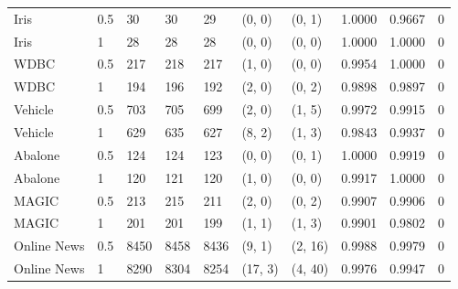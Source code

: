 \begin{tabular}{llllllllll}
Iris & 0.5 & 30 & 30 & 29 & (0, 0) & (0, 1) & 1.0000 & 0.9667 & 0 \\
Iris & 1 & 28 & 28 & 28 & (0, 0) & (0, 0) & 1.0000 & 1.0000 & 0 \\
WDBC & 0.5 & 217 & 218 & 217 & (1, 0) & (0, 0) & 0.9954 & 1.0000 & 0 \\
WDBC & 1 & 194 & 196 & 192 & (2, 0) & (0, 2) & 0.9898 & 0.9897 & 0 \\
Vehicle & 0.5 & 703 & 705 & 699 & (2, 0) & (1, 5) & 0.9972 & 0.9915 & 0 \\
Vehicle & 1 & 629 & 635 & 627 & (8, 2) & (1, 3) & 0.9843 & 0.9937 & 0 \\
Abalone & 0.5 & 124 & 124 & 123 & (0, 0) & (0, 1) & 1.0000 & 0.9919 & 0 \\
Abalone & 1 & 120 & 121 & 120 & (1, 0) & (0, 0) & 0.9917 & 1.0000 & 0 \\
MAGIC & 0.5 & 213 & 215 & 211 & (2, 0) & (0, 2) & 0.9907 & 0.9906 & 0 \\
MAGIC & 1 & 201 & 201 & 199 & (1, 1) & (1, 3) & 0.9901 & 0.9802 & 0 \\
Online News & 0.5 & 8450 & 8458 & 8436 & (9, 1) & (2, 16) & 0.9988 & 0.9979 & 0 \\
Online News & 1 & 8290 & 8304 & 8254 & (17, 3) & (4, 40) & 0.9976 & 0.9947 & 0 \\
\end{tabular}
